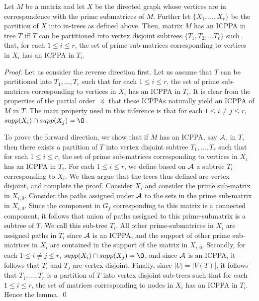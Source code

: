 \documentclass{llncs}
\def\cA{{\cal A}}
\begin{document}
\begin{lemma}
\label{lem:subicppa}
Let $M$ be a matrix and let $X$ be the directed graph whose vertices
are in correspondence with the prime submatrices of $M$.  Further let
$\{X_1,\ldots,X_r\}$ be the partition of $X$ into in-trees as defined
above. 
Then, matrix $M$ has an ICPPA in tree $T$ iff $T$ can be partitioned
into vertex disjoint subtrees 
 $\{T_1, T_2, \dots T_r\}$ such that, for each $1 \leq i \leq r$, the
 set of prime sub-matrices corresponding to vertices in $X_i$ has an
 ICPPA in $T_i$. 
\end{lemma}
\begin{proof}
Let us consider the reverse direction first.  Let us assume that $T$
can be partitioned into $T_1, \ldots, T_r$ such 
that for each $1 \leq i \leq r $, the set of prime sub-matrices
corresponding to vertices in $X_i$ has an ICPPA in $T_i$.  It is clear
from the properties of the partial order $\preccurlyeq$ that these
ICPPAs naturally yield an ICPPA  of $M$ in $T$.  The main property
used in this inference is that for each $1 \leq i \neq j \leq r$,
$supp(X_i) \cap supp(X_j) = \O$.   

\noindent
To prove the forward direction, we show that if $M$ has an ICPPA, say
$\cA$, in $T$, then there exists 
  a partition of $T$ into vertex disjoint subtree $T_1, \ldots, T_r$
  such that for each $1 \leq i \leq r$, the set of prime sub-matrices
  corresponding to vertices in $X_i$ has an ICPPA in $T_i$.  For each
  $1 \leq i \leq r$, we define based on $\cA$ a subtree  
$T_i$ corresponding to $X_i$.  We then argue that the trees thus
defined are vertex disjoint, and complete the proof. 
 Consider $X_i$ and consider the prime sub-matrix in $X_{i,0}$.
 Consider the paths assigned under $\cA$ to the sets in the prime
 sub-matrix in $X_{i,0}$.  Since the component in $G_f$ corresponding
 to this matrix is a connected component, it follows that union of
 paths assigned to this prime-submatrix is a subtree of $T$.  We call
 this sub-tree $T_i$.  All other prime-submatrices in $X_i$ are
 assigned paths in $T_i$ since $\cA$ is an ICPPA, and the support of
 other prime sub-matrices in $X_i$ are contained in the support of the
 matrix in $X_{i,0}$.  Secondly, for each $1 \leq i \neq j \leq r$,
 $supp(X_i) \cap supp(X_j) = \O$, and since $\cA$ is an ICPPA, it
 follows that $T_i$ and $T_j$ are vertex disjoint.  Finally, since
 $|U| = |V(T)|$, it follows that $T_1, \ldots, T_r$ is a partition of
 $T$ into vertex disjoint sub-trees such that for each $1 \leq i \leq
 r$, the set of matrices corresponding to nodes in $X_i$ has an ICPPA
 in $T_i$.  Hence the lemma. \qed
\end{proof}
\end{document}
